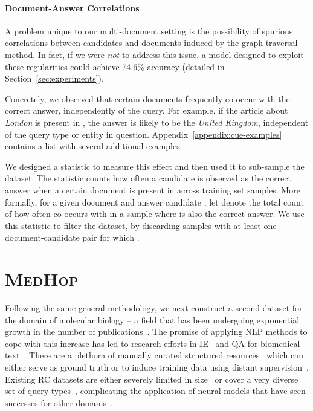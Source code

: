 \documentclass[11pt,letterpaper]{article}
\newcommand{\MedHop}{\textsc{MedHop}\xspace}
\begin{document}
\paragraph{Document-Answer Correlations}
\label{sec:document_answer}
A problem unique to our multi-document setting is the possibility of spurious correlations between candidates and documents induced by the graph traversal method. 
In fact, if we were \emph{not} to address this issue, a model designed to exploit these regularities could achieve 74.6\% accuracy (detailed in Section~\ref{sec:experiments}). 


Concretely, we observed that certain documents frequently co-occur with the correct answer, independently of the query.
For example, if the article about \emph{London} is present in , the answer is likely to be the \emph{United Kingdom}, independent of the query type or entity in question.
Appendix~\ref{appendix:cue-examples} contains a list with several additional examples.


We designed a statistic to measure this effect and then used it to sub-sample the dataset. 
The statistic counts how often a candidate  is observed as the correct answer when a certain document is present in  across training set samples.
More formally, for a given document  and answer candidate , let  denote the total count of how often  co-occurs with  in a sample where  is also the correct answer.
We use this statistic to filter the dataset, by discarding samples with at least one document-candidate pair  for which . 


\section{\MedHop}\label{sec:medhop}
Following the same general methodology, we next construct a second dataset for the domain of molecular biology -- a field that has been undergoing exponential growth in the number of publications~\cite{cohen2004natural}.
The promise of applying NLP methods to cope with this increase has led to research efforts in IE~\cite{hirschman2005overview,kim2011overview} and QA for biomedical text~\cite{hersh2007trec,nentidis2017results}.
There are a plethora of manually curated structured resources~\cite{ashburner2000gene,uniprot2016uniprot} which can either serve as ground truth or to induce training data using distant supervision~\cite{craven1999constructing,bobic2012improving}.
Existing RC datasets are either severely limited in size~\cite{hersh2007trec} or cover a very diverse set of query types~\cite{nentidis2017results}, complicating the application of neural models that have seen successes for other domains~\cite{wiese2017wiese}.
\end{document}
